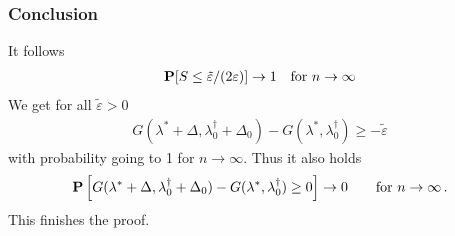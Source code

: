  \subsubsection*{Conclusion}
 It follows
 \begin{gather}
   \P[S\le
   \tilde{\varepsilon}/(2\varepsilon)
   ]\to 1
   \quad
   \text{for}\ 
   n\to \infty
 \end{gather}
We get
for all $\tilde{\varepsilon}>0$
\begin{gather}
   G
     (
     \lambda^*
      +
      \Delta
      ,
      \lambda^\dagger_0
      +
     \Delta_0
     )
     -
     G
     (
     \lambda^*,
      \lambda^\dagger_0
     )
     \ge
     -
     \tilde{\varepsilon}
\end{gather}
with probability going to 1 for $n\to \infty$.
Thus it also holds
\begin{gather}
  \P
  \left[ 
   G
     (
     \lambda^*
      +
      \Delta
      ,
      \lambda^\dagger_0
      +
     \Delta_0
     )
     -
     G
     (
     \lambda^*,
      \lambda^\dagger_0
     )
     \ge
     0
  \right]
  \to
  0
  \qquad
  \text{for}
  \ 
  n\to \infty
  \,.
\end{gather}
This finishes the proof.



